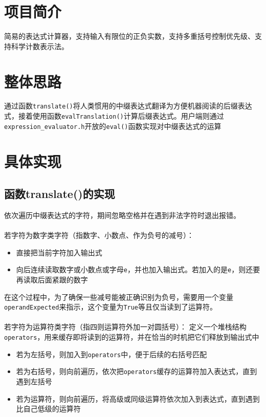 \documentclass[UTF8]{ctexart}
\begin{document}
\pagestyle{fancy}
\fancyhead{}

\section{项目简介}
简易的表达式计算器，支持输入有限位的正负实数，支持多重括号控制优先级、支持科学计数表示法。

\section{整体思路}
通过函数\verb|translate()|将人类惯用的中缀表达式翻译为方便机器阅读的后缀表达式，接着使用函数\verb|evalTranslation()|计算后缀表达式。用户端则通过\verb|expression_evaluator.h|开放的\verb|eval()|函数实现对中缀表达式的运算

\section{具体实现}
\subsection{函数translate()的实现}
依次遍历中缀表达式的字符，期间忽略空格并在遇到非法字符时退出报错。\\\\

若字符为数字类字符（指数字、小数点、作为负号的减号）：
\begin{itemize}
    \item 直接把当前字符加入输出式
    \item 向后连续读取数字或小数点或字母\verb|e|，并也加入输出式。若加入的是\verb|e|，则还要再读取后面紧跟的数字
\end{itemize}
在这个过程中，为了确保一些减号能被正确识别为负号，需要用一个变量\verb|operandExpected|来指示，这个变量为\verb|True|等且仅当读到了运算符。\\\\

若字符为运算符类字符（指四则运算符外加一对圆括号）：
定义一个堆栈结构\verb|operators|，用来缓存即将读到的运算符，并在恰当的时机把它们释放到输出式中
\begin{itemize}
    \item 若为左括号，则加入到\verb|operators|中，便于后续的右括号匹配
    \item 若为右括号，则向前遍历，依次把\verb|operators|缓存的运算符加入表达式，直到遇到左括号
    \item 若为运算符，则向前遍历，将高级或同级运算符依次加入到表达式，直到遇到比自己低级的运算符
\end{itemize}
\end{document}
